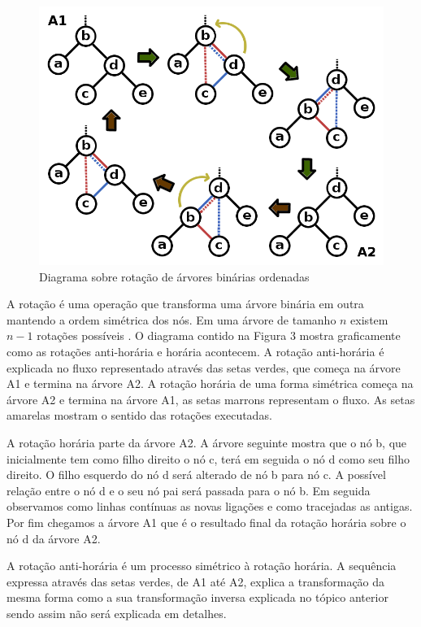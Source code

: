 \begin{figure}[H]
	\caption{\label{gram_cls}Diagrama sobre rotação de árvores binárias ordenadas}
	\begin{center}
	    \includegraphics[scale=0.4]{tree_rotations.png}
	\end{center}
\end{figure}

A rotação é uma operação que transforma uma árvore binária em outra mantendo a ordem simétrica dos nós. Em uma árvore de tamanho $n$ existem $n-1$ rotações possíveis \cite{binTree}. O diagrama contido na Figura 3 mostra graficamente como as rotações anti-horária e horária acontecem. A rotação anti-horária é explicada no fluxo representado através das setas verdes, que começa na árvore A1 e termina na árvore A2. A rotação horária de uma forma simétrica começa na árvore A2 e termina na árvore A1, as setas marrons representam o fluxo. As setas amarelas mostram o sentido das rotações executadas.

A rotação horária parte da árvore A2. A árvore seguinte mostra que o nó b, que inicialmente tem como filho direito o nó c, terá em seguida o nó d como seu filho direito. O filho esquerdo do nó d será alterado de nó b para nó c. A possível relação entre o nó d e o seu nó pai será passada para o nó b. Em seguida observamos como linhas contínuas as novas ligações e como tracejadas as antigas. Por fim chegamos a árvore A1 que é o resultado final da rotação horária sobre o nó d da árvore A2.

A rotação anti-horária é um processo simétrico à rotação horária. A sequência expressa através das setas verdes, de A1 até A2, explica a transformação da mesma forma como a sua transformação inversa explicada no tópico anterior sendo assim não será explicada em detalhes.


